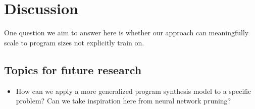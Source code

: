 \documentclass{article}
\begin{document}

\section{Discussion} %

One question we aim to answer here is whether our approach can meaningfully scale to program sizes not explicitly train on.

\subsection{Topics for future research}
\begin{itemize}
    \item How can we apply a more generalized program synthesis model to a specific problem? Can we take inspiration here from neural network pruning?
\end{itemize}

\nocite{*}
% 

\end{document}
